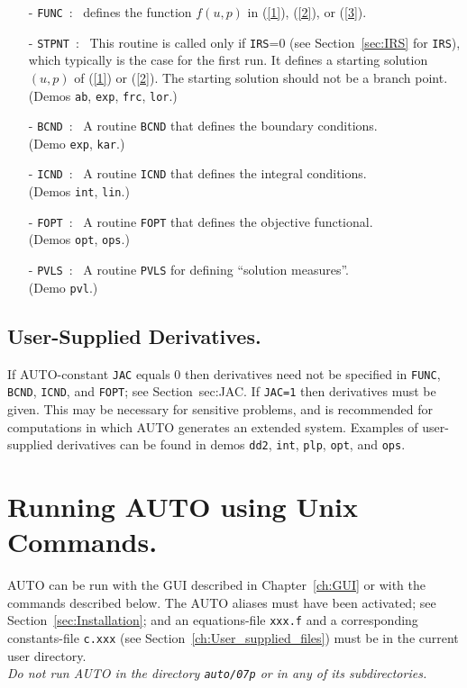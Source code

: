 \documentclass[12pt]{report}
\begin{document}
\begin{itemize}
\item[-] {\tt FUNC}~:~
  defines the function $f(u,p)$ in (\ref{1}), (\ref{2}), or (\ref{3}).
\item[-] {\tt STPNT}~:~
  This routine is called only if {\tt IRS}=0 
(see Section~\ref{sec:IRS} for {\tt IRS}),
  which typically is the case for the first run.
  It defines a starting solution $(u,p)$ of (\ref{1}) or (\ref{2}).
  The starting solution should not be a branch point.\\ 
  (Demos {\tt ab}, {\tt exp}, {\tt frc}, {\tt lor}.)  
\item[-] {\tt BCND}~:~ 
  A routine {\tt BCND} that defines the boundary conditions. \\
  (Demo {\tt exp}, {\tt kar}.)
\item[-] {\tt ICND}~:~ 
  A routine {\tt ICND} that defines the integral conditions. \\ 
  (Demos {\tt int}, {\tt lin}.)  
\item[-] {\tt FOPT}~:~ 
  A routine {\tt FOPT} that defines the objective functional. \\ 
  (Demos {\tt opt}, {\tt ops}.)  
\item[-] {\tt PVLS}~:~
  A routine {\tt PVLS} for defining ``solution measures''. \\
  (Demo {\tt pvl}.)
\end{itemize}
 
\section{ User-Supplied Derivatives.} \label{sec:derivatives}
If {\cal AUTO}-constant {\tt JAC} equals 0 
then derivatives need not be specified in 
{\tt FUNC}, {\tt BCND}, {\tt ICND}, and {\tt FOPT}; see Section~{sec:JAC}.
If {\tt JAC=1} then derivatives must be given.
This may be necessary for sensitive 
problems, and is recommended for computations in which {\cal AUTO} 
generates an extended system.
Examples of user-supplied derivatives can be found in
demos  {\tt dd2}, {\tt int}, {\tt plp}, {\tt opt}, and {\tt ops}.

\chapter{ Running {\cal AUTO} using Unix Commands.} \label{sec:command_mode}
{\cal AUTO} can be run with the GUI described in Chapter~\ref{ch:GUI} 
or with the commands described below.
The {\cal AUTO} aliases must have been activated; see Section~\ref{sec:Installation}; 
and an equations-file {\tt xxx.f} 
and a corresponding constants-file {\tt c.xxx} 
(see Section~\ref{ch:User_supplied_files})
must be in the current user directory.
\\
{\it Do not run {\cal AUTO} in the directory {\tt auto/07p} 
or in any of its subdirectories.}
\end{document}
